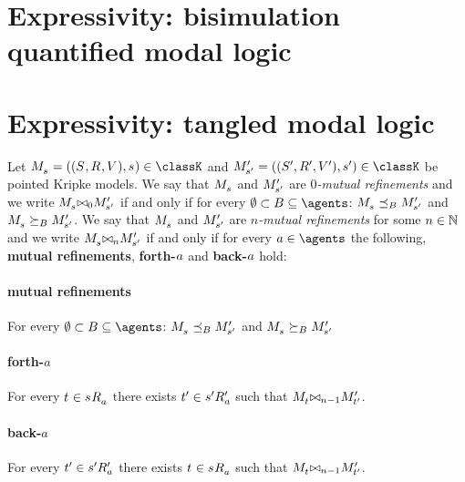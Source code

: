 \section{Expressivity: bisimulation quantified modal logic}\label{rml-k4-bqml}

\section{Expressivity: tangled modal logic}\label{rml-k4-tangle}

\begin{definition}
Let $\kPModelAndTuple{\kStateS} \in \classK$ and $\kPModelAndTupleP{\kStateSP} \in \classK$ be pointed Kripke models.
We say that $\kPModel{\kStateS}$ and ${M^{\prime}_{{s}^{\prime}}}$ are {\em $0$-mutual refinements}
and we write $\kPModel{\kStateS} \bisimref[0] \kPModelP{\kStateSP}$
if and only if for every $\emptyset \subset \agentsB \subseteq \agents$: 
$\kPModel{\kStateS} \refinesBs \kPModelP{\kStateSP}$ 
and $\kPModel{\kStateS} \simulatesBs \kPModelP{\kStateSP}$.
We say that $\kPModel{\kStateS}$ and ${M^{\prime}_{{s}^{\prime}}}$ are {\em $n$-mutual refinements}
for some $n \in \mathbb{N}$
and we write $\kPModel{\kStateS} \bisimref[n] \kPModelP{\kStateSP}$
if and only if for every $\agentA \in \agents$
the following, {\bf mutual refinements}, {\bf forth-$a$} and {\bf back-$a$} hold:

\paragraph{mutual refinements} 
For every $\emptyset \subset \agentsB \subseteq \agents$:
$\kPModel{\kStateS} \refinesBs \kPModelP{\kStateSP}$ 
and $\kPModel{\kStateS} \simulatesBs \kPModelP{\kStateSP}$ 

\paragraph{forth-$a$} For every $\kStateT \in \kStateS \kAccessibility{\agentA}$ 
there exists ${t}^{\prime} \in {s}^{\prime} {R^{\prime}_{a}}$
such that $\kPModel{\kStateT} \bisimref[n-1] \kPModelP{\kStateTP}$.

\paragraph{back-$a$} For every ${t}^{\prime} \in {s}^{\prime} {R^{\prime}_{a}}$
there exists $\kStateT \in \kStateS \kAccessibility{\agentA}$ 
such that $\kPModel{\kStateT} \bisimref[n-1] \kPModelP{\kStateTP}$.
\end{definition}

